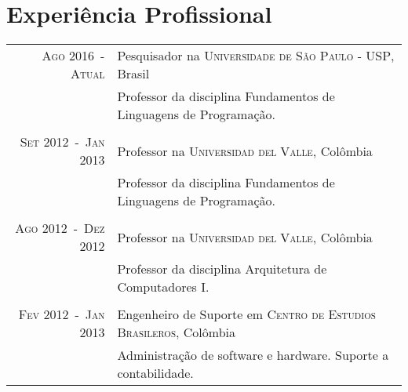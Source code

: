 \documentclass[a4paper,10pt]{article}
\begin{document}
\section{Experiência Profissional}
\begin{tabular}{rl}

    \textsc{Ago 2016~-~Atual}       & Pesquisador na \textsc{Universidade de São Paulo - USP}, Brasil \\
                                    &\footnotesize{Professor da disciplina Fundamentos de Linguagens de Programação.} \\
                                    &\\

    \textsc{Set 2012~-~Jan 2013}    & Professor na \textsc{Universidad del Valle}, Colômbia \\
                                    &\footnotesize{Professor da disciplina Fundamentos de Linguagens de Programação.} \\
                                    &\\

    \textsc{Ago 2012~-~Dez 2012}    & Professor na \textsc{Universidad del Valle}, Colômbia \\
                                    &\footnotesize{Professor da disciplina Arquitetura de Computadores I.} \\
                                    &\\

    \textsc{Fev 2012~-~Jan 2013}    & Engenheiro de Suporte em \textsc{Centro de Estudios Brasileros}, Colômbia \\
                                    &\footnotesize{Administração de software e hardware. Suporte a contabilidade.} \\

\end{tabular}

\end{document}
